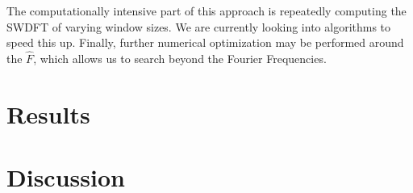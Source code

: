 \documentclass[11pt]{article}
\theoremstyle{plain}
\theoremstyle{definition}
\begin{document}
The computationally intensive part of this approach is repeatedly computing the SWDFT of varying window sizes. We are currently looking into algorithms to speed this up. Finally, further numerical optimization may be performed around the $\hat{F}$, which allows us to search beyond the Fourier Frequencies. 

\section{Results}
\label{sec:results}

\section{Discussion}
\label{sec:discussion}



\end{document}
